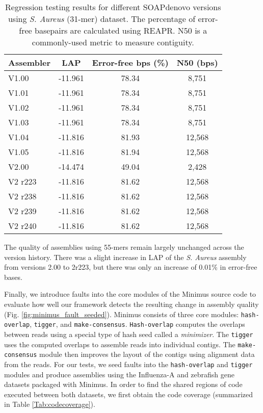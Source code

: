 \begin{table}[tb!]
\begin{center}
\caption{Regression testing results for different SOAPdenovo versions using \emph{S. Aureus} (31-mer) dataset.  The percentage of error-free basepairs are calculated using REAPR. N50 is a commonly-used metric to measure contiguity.}
\begin{tabular}{l|ccc}
Assembler & LAP        & Error-free bps (\%) & N50 (bps)    \\
\hline
V1.00   & -11.961 & 78.34 & 8,751  \\
V1.01   & -11.961 & 78.34 & 8,751  \\
V1.02   & -11.961 & 78.34 & 8,751  \\
V1.03   & -11.961 & 78.34 & 8,751  \\
V1.04   & -11.816 & 81.93 & 12,568 \\
V1.05   & -11.816 & 81.94 & 12,568 \\
V2.00   & -14.474 & 49.04 & 2,428  \\
V2 r223 & -11.816 & 81.62 & 12,568 \\
V2 r238 & -11.816 & 81.62 & 12,568 \\
V2 r239 & -11.816 & 81.62 & 12,568 \\
V2 r240 & -11.816 & 81.62 & 12,568 \\
\hline
\end{tabular}
\end{center}
\label{table:soapdenovo_crudii}
\end{table}
\renewcommand{\baselinestretch}{2}
\small\normalsize



The quality of assemblies using 55-mers remain largely unchanged across the version history.
There was a slight increase in LAP of the \emph{S. Aureus} assembly from versions 2.00 to 2r223, but there was only an increase of 0.01\% in error-free bases.



Finally, we introduce faults into the core modules of the Minimus source code to evaluate how well our framework detects the resulting change in assembly quality (Fig. \ref{fig:minimus_fault_seeded}).
Minimus consists of three core modules: \texttt{hash-overlap}, \texttt{tigger}, and \texttt{make-consensus}.
\texttt{Hash-overlap} computes the overlaps between reads using a special type of hash seed called a \emph{minimizer}\cite{roberts2004reducing}.
The \texttt{tigger} uses the computed overlaps to assemble reads into individual contigs.
The \texttt{make-consensus} module then improves the layout of the contigs using alignment data from the reads.
For our tests, we seed faults into the \texttt{hash-overlap} and \texttt{tigger} modules and produce assemblies using the Influenza-A and zebrafish gene datasets packaged with Minimus.
In order to find the shared regions of code executed between both datasets, we first obtain the code coverage (summarized in Table \ref{Tab:codecoverage}).




